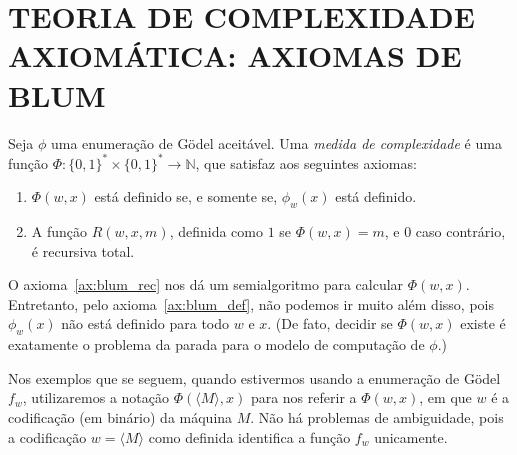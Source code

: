 \section{TEORIA DE COMPLEXIDADE AXIOMÁTICA: AXIOMAS DE BLUM}
\label{sec:blum_axioms}

\begin{definition}
    Seja $\phi$ uma enumeração de Gödel aceitável.
    Uma \emph{medida de complexidade} é uma função
    $\Phi: \{0, 1\}^* \times \{0, 1\}^* \to \mathbb N$,
    que satisfaz aos seguintes axiomas:\footnotemark
    \begin{enumerate} [label=\textbf{Axioma \arabic*}, ref=\arabic*, align=left]
        \item
            \label{ax:blum_def}
            $\Phi(w, x)$ está definido
            se, e somente se,
            $\phi_w(x)$ está definido.
        \item
            \label{ax:blum_rec}
            A função $R(w, x, m)$,
            definida como $1$ se $\Phi(w, x) = m$,
            e $0$ caso contrário,
            é recursiva total.
    \end{enumerate}

\end{definition}

O axioma~\ref{ax:blum_rec}
nos dá um semialgoritmo para calcular $\Phi(w, x)$.
Entretanto, pelo axioma~\ref{ax:blum_def},
não podemos ir muito além disso,
pois $\phi_w(x)$ não está definido para todo $w$ e $x$.
(De fato, decidir se $\Phi(w, x)$ existe
é exatamente o problema da parada para o modelo de computação de $\phi$.)

Nos exemplos que se seguem,
quando estivermos usando a enumeração de Gödel $f_w$,
utilizaremos a notação $\Phi(\langle M \rangle, x)$
para nos referir a $\Phi(w, x)$,
em que $w$ é a codificação (em binário) da máquina $M$.
Não há problemas de ambiguidade,
pois a codificação $w = \langle M \rangle$ como definida
identifica a função $f_w$ unicamente.

